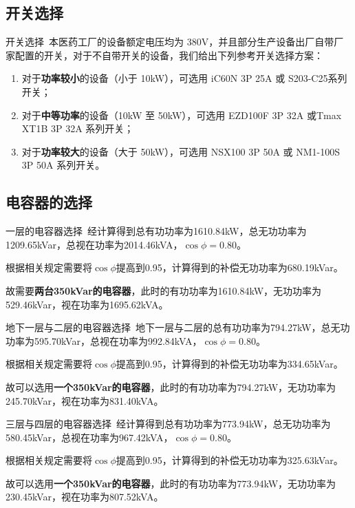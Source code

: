 \documentclass{beamer}
\begin{document}
    \subsection{开关选择}
    \begin{frame}{开关选择}{\thesection \, \secname}
        本医药工厂的设备额定电压均为 380V，并且部分生产设备出厂自带厂
家配置的开关，对于不自带开关的设备，我们给出下列参考开关选择方案：
\begin{enumerate}
    \item 对于\textbf{功率较小}的设备（小于 10kW），可选用 iC60N 3P 25A 或 S203-C25系列开关；
    \item 对于\textbf{中等功率}的设备（10kW 至 50kW），可选用 EZD100F 3P 32A 或Tmax XT1B 3P 32A 系列开关；
    \item 对于\textbf{功率较大}的设备（大于 50kW），可选用 NSX100 3P 50A 或 NM1-100S 3P 50A 系列开关。
\end{enumerate}
    \end{frame}
    \subsection{电容器的选择}
    \begin{frame}{一层的电容器选择}{\thesubsection \, \subsecname}
    经计算得到总有功功率为1610.84kW，总无功功率为1209.65kVar，总视在功率为2014.46kVA，$\cos \phi = 0.80$。

根据相关规定需要将$\cos \phi$提高到0.95，计算得到的补偿无功功率为680.19kVar。

故需要\textbf{两台350kVar的电容器}，此时的有功功率为1610.84kW，无功功率为529.46kVar，视在功率为1695.62kVA。
    \end{frame}
    \begin{frame}{地下一层与二层的电容器选择}{\thesubsection \, \subsecname}
    地下一层与二层的总有功功率为794.27kW，总无功功率为595.70kVar，总视在功率为992.84kVA，$\cos \phi = 0.80$。

根据相关规定需要将$\cos \phi$提高到0.95，计算得到的补偿无功功率为334.65kVar。

故可以选用\textbf{一个350kVar的电容器}，此时的有功功率为794.27kW，无功功率为245.70kVar，视在功率为831.40kVA。
    \end{frame}
    \begin{frame}{三层与四层的电容器选择}{\thesubsection \, \subsecname}
    经计算得到总有功功率为773.94kW，总无功功率为580.45kVar，总视在功率为967.42kVA，$\cos \phi = 0.80$。

根据相关规定需要将$\cos \phi$提高到0.95，计算得到的补偿无功功率为325.63kVar。

故可以选用\textbf{一个350kVar的电容器}，此时的有功功率为773.94kW，无功功率为230.45kVar，视在功率为807.52kVA。

    \end{frame}
\end{document}
